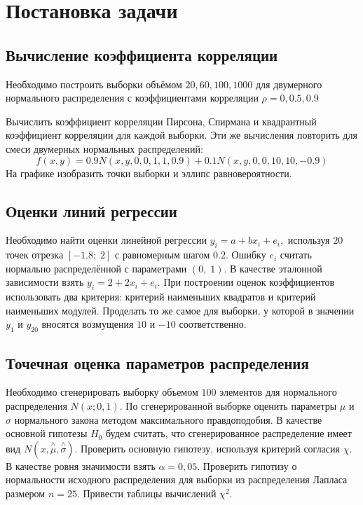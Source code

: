 \documentclass[a4]{article}
\renewcommand{\listoffigures}{\begingroup %
\tocsection
\tocfile{\listfigurename}{lof}
\endgroup}
\renewcommand{\listoftables}{\begingroup %
\tocsection
\tocfile{\listtablename}{lot}
\endgroup}
\begin{document}
\newpage
\tableofcontents{}
\newpage
\listoffigures{}
\listoftables{}
\newpage

\section{Постановка задачи}

\subsection{Вычисление коэффициента корреляции}

Необходимо построить выборки объёмом $20, 60, 100, 1000$ для двумерного нормального распределения с коэффициентами корреляции $\rho = 0, 0.5, 0.9$

Вычислить коэффициент корреляции Пирсона, Спирмана и квадрантный коэффициент корреляции для каждой выборки. Эти же вычисления повторить для смеси двумерных нормальных распределений: 
\begin{equation}
    f(x,y) = 0.9N(x,y,0,0,1,1,0.9)+0.1N(x,y,0,0,10,10,-0.9)
\end{equation}
На графике изобразить точки выборки и эллипс равновероятности.

\subsection{Оценки линий регрессии}
Необходимо найти оценки линейной регрессии $y_i=a+bx_i+e_i,$ используя $20$ точек отрезка $[-1.8;\;2]$ с равномерным шагом $0.2.$ Ошибку $e_i$ считать нормально распределённой с параметрами $(0,\;1).$ В качестве эталонной зависимости взять $y_i=2+2x_i+e_i.$ При построении оценок коэффициентов использовать два критерия: критерий наименьших квадратов и критерий наименьших модулей.
Проделать то же самое для выборки, у которой в значении $y_1$ и $y_{20}$ вносятся возмущения $10$ и $-10$ соответственно.

\subsection{Точечная оценка параметров распределения}

Необходимо сгенерировать выборку объемом $100$ элементов для нормального распределения $N(x;0,1).$ По сгенерированной выборке оценить параметры $\mu$ и $\sigma$ нормального закона методом максимального правдоподобия. В качестве основной гипотезы $H_0$ будем считать, что сгенерированное распределение имеет вид $N(x,\overset{\wedge}{\mu},\overset{\wedge}{\sigma} ).$ Проверить основную гипотезу, используя критерий согласия $\chi$. В качестве ровня значимости взять $\alpha=0,05.$ Проверить гипотизу о нормальности исходного распределения для выборки из распределения Лапласа размером $ n = 25 .$ Привести таблицы вычислений $\chi^2.$
\end{document}

